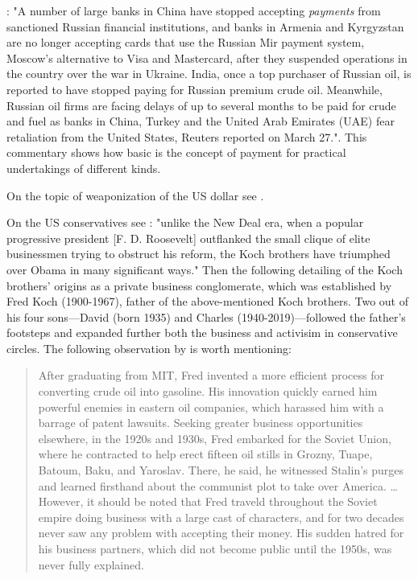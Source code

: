 \citep{newsweek2024}: "A number of large banks in China have stopped accepting \textit{payments} from sanctioned Russian financial institutions, and banks in Armenia and Kyrgyzstan are no longer accepting cards that use the Russian Mir payment system, Moscow's alternative to Visa and Mastercard, after they suspended operations in the country over the war in Ukraine. India, once a top purchaser of Russian oil, is reported to have stopped paying for Russian premium crude oil. Meanwhile, Russian oil firms are facing delays of up to several months to be paid for crude and fuel as banks in China, Turkey and the United Arab Emirates (UAE) fear retaliation from the United States, Reuters reported on March 27.". This commentary shows how basic is the concept of payment for practical undertakings of different kinds.

On the topic of weaponization of the US dollar see \citep{ali2022,ali2023}.

On the US conservatives see \citep[see Chapter 3][pp.~83-124]{fang2013}: "unlike the New Deal era, when a popular progressive president [F. D. Roosevelt] outflanked the small clique of elite businessmen trying to obstruct his reform, the Koch brothers have triumphed over Obama in many significant ways." Then the following detailing of the Koch brothers' origins as a private business conglomerate, which was established by Fred Koch (1900-1967), father of the above-mentioned Koch brothers. Two out of his four sons---David (born 1935) and Charles (1940-2019)---followed the father's footsteps and expanded further both the business and activisim in conservative circles. The following observation by \citeauthor{fang2013} is worth mentioning:

\begin{quote}
After graduating from MIT, Fred invented a more efficient process for converting crude oil into gasoline. His innovation quickly earned him powerful enemies in eastern oil companies, which harassed him with a barrage of patent lawsuits. Seeking greater business opportunities elsewhere, in the 1920s and 1930s, Fred embarked for the Soviet Union, where he contracted to help erect fifteen oil stills in Grozny, Tuape, Batoum, Baku, and Yaroslav. There, he said, he witnessed Stalin's purges and learned firsthand about the communist plot to take over America. \dots However, it should be noted that Fred traveld throughout the Soviet empire doing business with a large cast of characters, and for two decades never saw any problem with accepting their money. His sudden hatred for his business partners, which did not become public until the 1950s, was never fully explained.
\citep[pp.~94-95]{fang2013}
\end{quote}

